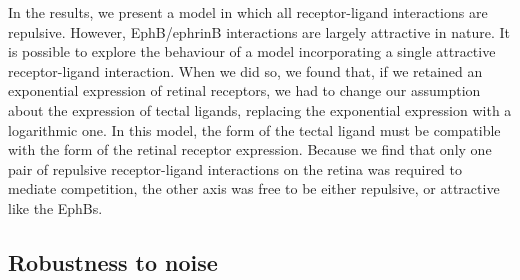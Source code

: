 \documentclass[9pt,lineno,draft]{elife}
\begin{document}
In the results, we present a model in which all receptor-ligand interactions are repulsive. However, EphB/ephrinB interactions are largely attractive in nature. It is possible to explore the behaviour of a model incorporating a single attractive receptor-ligand interaction.
When we did so, we found that, if we retained an exponential expression of retinal receptors, we had to change our assumption about the expression of tectal ligands, replacing the exponential expression with a logarithmic one.
In this model, the form of the tectal ligand must be compatible with the form of the retinal receptor expression.
Because we find that only one pair of repulsive receptor-ligand interactions on the retina was required to mediate competition, the other axis was free to be either repulsive, or attractive like the EphBs.

\subsection*{Robustness to noise}
\end{document}
